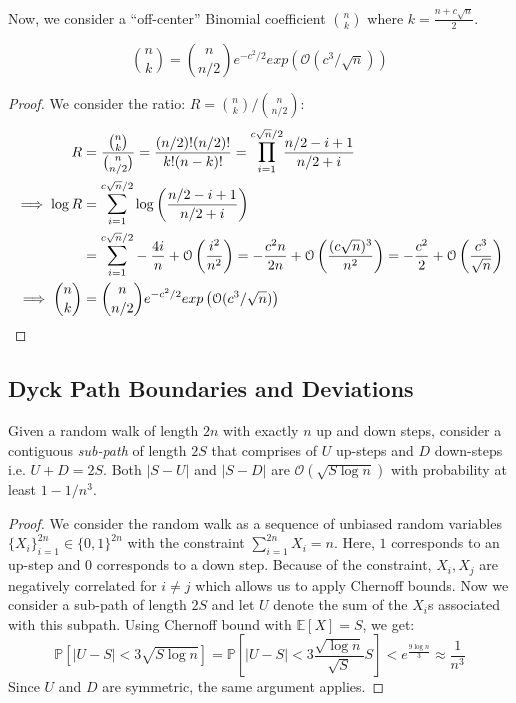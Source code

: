 Now, we consider a ``off-center'' Binomial coefficient $\binom{n}{k}$ where $k = \frac{n+c\sqrt n}{2}$.
\begin{lemma}
\label{lem:close_to_central_binomial_coefficient}
\[
\binom{n}{k} = \binom{n}{n/2} e^{-c^2/2}exp\left( \mathcal O(c^3/\sqrt n)\right)
\]
\end{lemma}
\begin{proof}
We consider the ratio: $R = \binom{n}{k}/\binom{n}{n/2}$:
\begin{align}
R &= \frac{\binom{n}{k}}{\binom{n}{n/2}}
= \frac{(n/2)!(n/2)!}{k!(n-k)!} = \mathlarger\prod\limits_{i=1}^{c\sqrt n/2}\frac{n/2-i+1}{n/2+i}\\
\implies \log R &= \mathlarger\sum\limits_{i=1}^{c\sqrt n/2}\log\left(\frac{n/2-i+1}{n/2+i} \right)\\
&= \mathlarger\sum\limits_{i=1}^{c\sqrt n/2} - \frac{4i}{n} + \mathcal O\left( \frac{i^2}{n^2}\right)
= - \frac{c^2n}{2n} + \mathcal O\left( \frac{(c\sqrt n)^3}{n^2}\right)
= - \frac{c^2}{2} + \mathcal O\left( \frac{c^3}{\sqrt n}\right)\\
\implies \binom{n}{k} &= \binom{n}{n/2} e^{-c^2/2}exp\left( \mathcal O(c^3/\sqrt n)\right)
\end{align}
\end{proof}



\subsection{Dyck Path Boundaries and Deviations}%
\label{sub:dyck_path_boundaries_and_deviations}

\begin{lemma}
\label{lem:random_walk_deviation_bound}
Given a random walk of length $2n$ with exactly $n$ up and down steps,
consider a contiguous \emph{sub-path} of length $2S$ that comprises of $U$ up-steps and $D$ down-steps i.e. $U + D = 2S$.
Both $|S-U|$ and $|S-D|$ are $\mathcal O(\sqrt{S\log n})$ with probability at least $1-1/n^3$.
\end{lemma}
\begin{proof}
We consider the random walk as a sequence of unbiased random variables $\{X_i\}_{i=1}^{2n}\in \{0,1\}^{2n}$
with the constraint $\sum\limits_{i=1}^{2n}X_i = n$.
Here, $1$ corresponds to an up-step and $0$ corresponds to a down step.
Because of the constraint, $X_i, X_j$ are negatively correlated for $i \not= j$ which allows us to apply Chernoff bounds.
Now we consider a sub-path of length $2S$ and let $U$ denote the sum of the $X_i$s associated with this subpath.
Using Chernoff bound with $\mathbb E[X] = S$, we get:
\[
\mathbb P\left[ |U-S| < 3\sqrt{S \log n}\right]
= \mathbb P\left[ |U-S| < 3\frac{\sqrt{\log n}}{\sqrt S}S\right] < e^{\frac{9\log n}{3}} \approx \frac{1}{n^3}
\]
Since $U$ and $D$ are symmetric, the same argument applies.
\end{proof}

